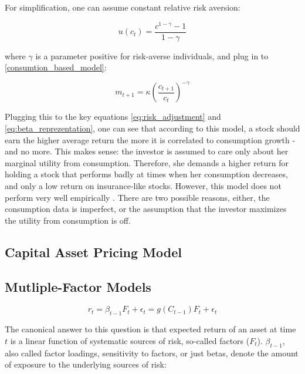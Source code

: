 		 	For simplification, one can assume constant relative risk aversion:
		 	
		 	\begin{equation}
		 		u(c_t) = \frac{c^{1-\gamma}-1}{1-\gamma}
		 	\end{equation}
		 	
		 	where $\gamma$ is a parameter positive for risk-averse individuals, and plug in to \ref{consumtion_based_model}: 
		 	
		 	\begin{equation}
		 		m_{t+1} = \kappa \left(\frac{c_{t+1}}{c_t}\right)^{-\gamma}
		 	\end{equation}
		 	
		 	Plugging this to the key equations \ref{eq:risk_adjustment} and \ref{eq:beta_reprezentation}, one can see that according to this model, a stock should earn the higher average return the more it is correlated to consumption growth - and no more. This makes sense: the investor is assumed to care only about her marginal utility from consumption. Therefore, she demands a higher return for holding a stock that performs badly at times when her consumption decreases, and only a low return on insurance-like stocks. However, this model does not perform very well empirically \cite{cochrane1996cross}. There are two possible reasons, either, the consumption data is imperfect, or the assumption that the investor maximizes the utility from consumption is off. 
	 	
	 	\subsection{Capital Asset Pricing Model}
	 	
	 	\subsection{Mutliple-Factor Models}
	 	
	 		
	 	
	 	
	 	\begin{equation}
	 		r_t = \beta_{t-1}F_t + \epsilon_t  = g(C_{t-1})F_t + \epsilon_t \label{eq:asset_pricing}
	 	\end{equation}
	 	
	 	The canonical answer to this question is that expected return of an asset at time $t$ is a linear function of systematic sources of risk, so-called factors ($F_t$). $\beta_{t-1}$, also called factor loadings, sensitivity to factors, or just betas, denote the amount of exposure to the underlying sources of risk: 
			
